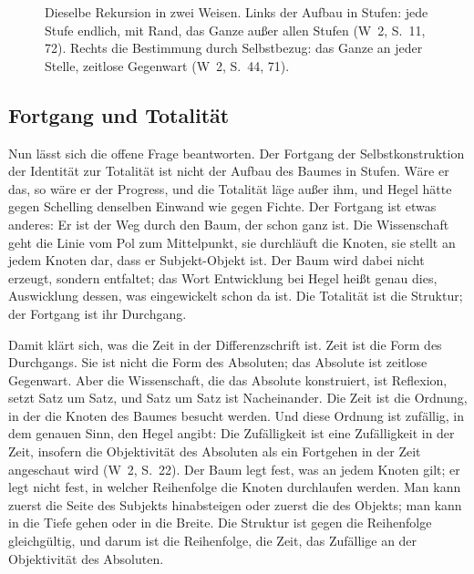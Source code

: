 \documentclass[11pt,a4paper]{article}
\newcommand{\SO}{Subjekt-Objekt}
\newcommand{\Werke}[1]{(W~2, S.~#1)}
\begin{document}
\begin{figure}[!htb]
{}
\caption{Dieselbe Rekursion in zwei Weisen. Links der Aufbau in Stufen: jede Stufe endlich, mit Rand, das Ganze außer allen Stufen (W~2, S.~11, 72). Rechts die Bestimmung durch Selbstbezug: das Ganze an jeder Stelle, zeitlose Gegenwart (W~2, S.~44, 71).}
\label{fig:zweiweisen}
\end{figure}

\subsection{Fortgang und Totalität}

Nun lässt sich die offene Frage beantworten. Der Fortgang der Selbstkonstruktion der Identität zur Totalität ist nicht der Aufbau des Baumes in Stufen. Wäre er das, so wäre er der Progress, und die Totalität läge außer ihm, und Hegel hätte gegen Schelling denselben Einwand wie gegen Fichte. Der Fortgang ist etwas anderes: Er ist der Weg durch den Baum, der schon ganz ist. Die Wissenschaft geht die Linie vom Pol zum Mittelpunkt, sie durchläuft die Knoten, sie stellt an jedem Knoten dar, dass er \SO{} ist. Der Baum wird dabei nicht erzeugt, sondern entfaltet; das Wort Entwicklung bei Hegel heißt genau dies, Auswicklung dessen, was eingewickelt schon da ist. Die Totalität ist die Struktur; der Fortgang ist ihr Durchgang.

Damit klärt sich, was die Zeit in der Differenzschrift ist. Zeit ist die Form des Durchgangs. Sie ist nicht die Form des Absoluten; das Absolute ist zeitlose Gegenwart. Aber die Wissenschaft, die das Absolute konstruiert, ist Reflexion, setzt Satz um Satz, und Satz um Satz ist Nacheinander. Die Zeit ist die Ordnung, in der die Knoten des Baumes besucht werden. Und diese Ordnung ist zufällig, in dem genauen Sinn, den Hegel angibt: \glqq Die Zufälligkeit ist eine Zufälligkeit in der Zeit, insofern die Objektivität des Absoluten als ein Fortgehen in der Zeit angeschaut wird\grqq{} \Werke{22}. Der Baum legt fest, was an jedem Knoten gilt; er legt nicht fest, in welcher Reihenfolge die Knoten durchlaufen werden. Man kann zuerst die Seite des Subjekts hinabsteigen oder zuerst die des Objekts; man kann in die Tiefe gehen oder in die Breite. Die Struktur ist gegen die Reihenfolge gleichgültig, und darum ist die Reihenfolge, die Zeit, das Zufällige an der Objektivität des Absoluten.
\end{document}

